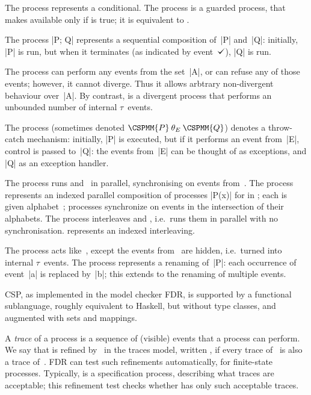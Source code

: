 The process  represents a conditional. 
The process  is a guarded process, that makes  available
only if  is true; it is equivalent to .

The process |P; Q| represents a sequential composition of~|P| and~|Q|:
initially, |P| is run, but when it terminates (as indicated by event~$\tick$),
|Q| is run. 

The process  can perform any events from the set~|A|, or can
refuse any of those events; however, it cannot diverge.  Thus it allows
arbtrary non-divergent behaviour over~|A|.  By contrast,  is a
divergent process that performs an unbounded number of internal $\tau$~events.

The process \CSPM{P [|E|> Q} 
(sometimes denoted $\CSPMM{P} \mathbin{\theta_E} \CSPMM{Q}$) denotes a
  throw-catch mechanism: initially, |P| is executed, but if it performs an
  event from~|E|, control is passed to~|Q|: the events from~|E| can be thought
  of as exceptions, and |Q| as an exception handler.

The process  runs  and~ in parallel,
synchronising on events from~.  The process  represents an indexed parallel composition of processes |P(x)| for
 in ; each  is given alphabet~;
processes synchronize on events in the intersection of their alphabets.
The process  interleaves  and , i.e.\ runs them
in parallel with no synchronisation.   represents an
indexed interleaving.

The process  acts like~, except the events from~
are hidden, i.e.~turned into internal $\tau$~events.  
%
The process  represents a renaming of~|P|: each occurrence of
event~|a| is replaced by~|b|; this extends to the renaming of multiple
events. 

CSP, as implemented in the model checker FDR, is supported by a functional
sublanguage, roughly equivalent to Haskell, but without type classes, and
augmented with sets and mappings. 
 
A \emph{trace} of a process is a sequence of (visible) events that a process
can perform.  We say that  is refined by~ in the traces model,
written \CSPM{P [T= Q}, if every trace of~ is also a trace
of~\@.  FDR can test such refinements automatically, for finite-state
processes.  Typically,  is a specification process, describing what
traces are acceptable; this refinement test checks whether  has only such
acceptable traces.  

